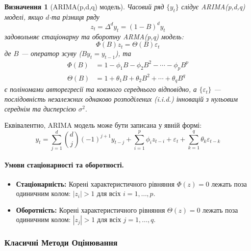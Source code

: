 \documentclass[12pt,a4paper]{article}
\newtheorem{definition}[theorem]{Визначення}
\begin{document}
\begin{definition}[ARIMA(p,d,q) модель]
Часовий ряд $\{y_t\}$ слідує ARIMA(p,d,q) моделі, якщо $d$-та різниця ряду
\begin{equation}
\label{eq:differencing}
z_t = \Delta^d y_t = (1-B)^d y_t
\end{equation}
задовольняє стаціонарну та оборотну ARMA(p,q) модель:
\begin{equation}
\label{eq:arma}
\Phi(B) z_t = \Theta(B) \varepsilon_t
\end{equation}
де $B$ --- оператор зсуву ($B y_t = y_{t-1}$), та
\begin{align}
\Phi(B) &= 1 - \phi_1 B - \phi_2 B^2 - \cdots - \phi_p B^p \label{eq:ar_poly} \\
\Theta(B) &= 1 + \theta_1 B + \theta_2 B^2 + \cdots + \theta_q B^q \label{eq:ma_poly}
\end{align}
є поліномами авторегресії та ковзного середнього відповідно, а $\{\varepsilon_t\}$ --- послідовність незалежних однаково розподілених (i.i.d.) інновацій з нульовим середнім та дисперсією $\sigma^2$.
\end{definition}

Еквівалентно, ARIMA модель може бути записана у явній формі:
\begin{equation}
\label{eq:arima_explicit}
y_t = \sum_{j=1}^{d} \binom{d}{j} (-1)^{j+1} y_{t-j} + \sum_{i=1}^{p} \phi_i z_{t-i} + \varepsilon_t + \sum_{k=1}^{q} \theta_k \varepsilon_{t-k}
\end{equation}

\paragraph{Умови стаціонарності та оборотності.}

\begin{itemize}
    \item \textbf{Стаціонарність:} Корені характеристичного рівняння $\Phi(z) = 0$ лежать поза одиничним колом: $|z_i| > 1$ для всіх $i = 1, \ldots, p$.

    \item \textbf{Оборотність:} Корені характеристичного рівняння $\Theta(z) = 0$ лежать поза одиничним колом: $|z_j| > 1$ для всіх $j = 1, \ldots, q$.
\end{itemize}

\subsubsection{Класичні Методи Оцінювання}
\end{document}
